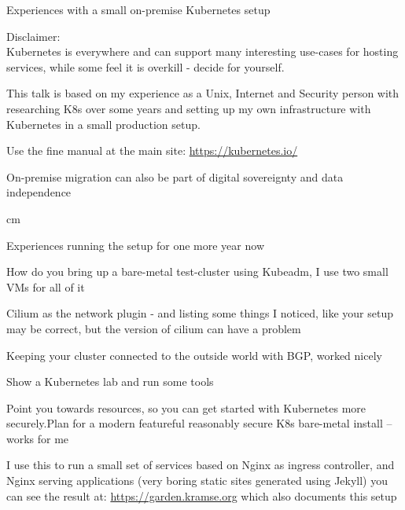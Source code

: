 \documentclass[Screen16to9,17pt]{foils}
\begin{document}
{}

\mytitlepage
{Experiences with a small on-premise Kubernetes setup}
{}
\LogoOn

\hlkprofiluk


\slide{}

Disclaimer:\\
Kubernetes is everywhere and can support many interesting use-cases for hosting services, while some feel it is overkill - decide for yourself.

This talk is based on my experience as a Unix, Internet and Security person with researching K8s over some years and setting up my own infrastructure with Kubernetes in a small production setup.

Use the fine manual at the main site:
\url{https://kubernetes.io/}

On-premise migration can also be part of digital sovereignty and data independence

 cm


\begin{list2}



\item Experiences running the setup for one more year now
\item How do you bring up a bare-metal test-cluster using Kubeadm, I use two small VMs for all of it
\item Cilium as the network plugin - and listing some things I noticed, like your setup may be correct, but the version of cilium can have a problem
\item Keeping your cluster connected to the outside world with BGP, worked nicely
\item Show a Kubernetes lab and run some tools
\item Point you towards resources, so you can get started with Kubernetes more securely.Plan for a modern featureful reasonably secure K8s bare-metal install -- works for me
\end{list2}



I use this to run a small set of services based on Nginx as ingress controller, and Nginx serving applications (very boring static sites generated using Jekyll) you can see the result at: \url{https://garden.kramse.org} which also documents this setup
\end{document}
